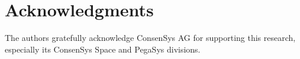 \documentclass[]{aiaa-tc}%
\begin{document}
\section*{Acknowledgments}

The authors gratefully acknowledge ConsenSys AG for supporting this research, especially its ConsenSys Space and PegaSys divisions.




\end{document}
